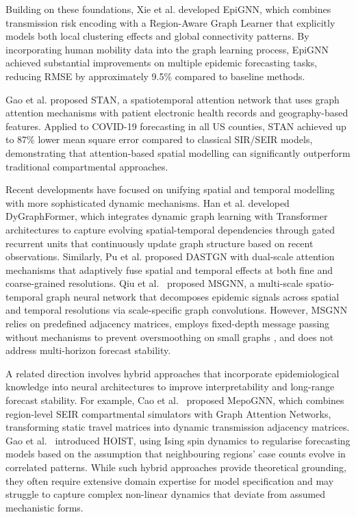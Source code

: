 \documentclass[final,1p,times]{elsarticle}
\begin{document}
Building on these foundations, Xie et al. \cite{xie2022epignn} developed EpiGNN, which combines transmission risk encoding with a Region-Aware Graph Learner that explicitly models both local clustering effects and global connectivity patterns. By incorporating human mobility data into the graph learning process, EpiGNN achieved substantial improvements on multiple epidemic forecasting tasks, reducing RMSE by approximately 9.5\% compared to baseline methods.

Gao et al. \cite{gao2021stan} proposed STAN, a spatiotemporal attention network that uses graph attention mechanisms with patient electronic health records and geography-based features. Applied to COVID-19 forecasting in all US counties, STAN achieved up to 87\% lower mean square error compared to classical SIR/SEIR models, demonstrating that attention-based spatial modelling can significantly outperform traditional compartmental approaches.

Recent developments have focused on unifying spatial and temporal modelling with more sophisticated dynamic mechanisms. Han et al. \cite{han2025dygraphformer} developed DyGraphFormer, which integrates dynamic graph learning with Transformer architectures to capture evolving spatial-temporal dependencies through gated recurrent units that continuously update graph structure based on recent observations. Similarly, Pu et al. \cite{pu2024dynamic} proposed DASTGN with dual-scale attention mechanisms that adaptively fuse spatial and temporal effects at both fine and coarse-grained resolutions. Qiu et al.~\cite{Qiu2024MSGNN} proposed MSGNN, a multi-scale spatio-temporal graph neural network that decomposes epidemic signals across spatial and temporal resolutions via scale-specific graph convolutions. However, MSGNN relies on predefined adjacency matrices, employs fixed-depth message passing without mechanisms to prevent oversmoothing on small graphs \cite{li2018deeper}, and does not address multi-horizon forecast stability.

A related direction involves hybrid approaches that incorporate epidemiological knowledge into neural architectures to improve interpretability and long-range forecast stability. For example, Cao et al.~\cite{cao2022mepognn} proposed MepoGNN, which combines region-level SEIR compartmental simulators with Graph Attention Networks, transforming static travel matrices into dynamic transmission adjacency matrices. Gao et al.~\cite{gao2023evidence} introduced HOIST, using Ising spin dynamics to regularise forecasting models based on the assumption that neighbouring regions' case counts evolve in correlated patterns. While such hybrid approaches provide theoretical grounding, they often require extensive domain expertise for model specification and may struggle to capture complex non-linear dynamics that deviate from assumed mechanistic forms.
\end{document}
